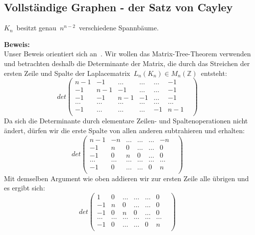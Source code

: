 \subsection{Vollständige Graphen - der Satz von Cayley}
\begin{Tms}
$K_n\,$ besitzt genau $\,n^{n-2}\,$ verschiedene Spannbäume.\\
\end{Tms}
\textbf{Beweis:}\\
Unser Beweis orientiert sich an~\cite{Lau_2004}. Wir wollen das Matrix-Tree-Theorem verwenden und betrach\-ten deshalb die Determinante der Matrix, die durch das Streichen der ersten Zeile und Spalte der Laplacematrix $\,L_n(K_n)\in M_n(\mathbb{Z})\,$ entsteht:
\begin{equation*}
det
\begin{pmatrix}
n-1&-1&\ldots&\ldots&\ldots&-1\\
-1&n-1&-1&\ldots&\ldots&-1\\
-1&-1&n-1&-1&\ldots&-1\\
\ldots&\ldots&\ldots&\ldots&\ldots&\ldots&\\
-1&\ldots&\ldots&\ldots&-1&n-1\\
\end{pmatrix}
\end{equation*}
Da sich die Determinante durch elementare Zeilen- und Spaltenoperationen nicht ändert, dürfen wir die erste Spalte von allen anderen subtrahieren und erhalten:
\begin{equation*}det
\begin{pmatrix}
n-1&-n&\ldots&\ldots&\ldots&-n\\
-1&n&0&\ldots&\ldots&0\\
-1&0&n&0&\ldots&0\\
\ldots&\ldots&\ldots&\ldots&\ldots&\ldots&\\
-1&0&\ldots&\ldots&0&n\\
\end{pmatrix}
\end{equation*}
Mit demselben Argument wie oben addieren wir zur ersten Zeile alle übrigen und es ergibt sich:
\begin{equation*}
det
\begin{pmatrix}
1&0&\ldots&\ldots&\ldots&0\\
-1&n&0&\ldots&\ldots&0\\
-1&0&n&0&\ldots&0\\
\ldots&\ldots&\ldots&\ldots&\ldots&\ldots&\\
-1&0&\ldots&\ldots&0&n\\
\end{pmatrix}
\end{equation*}
